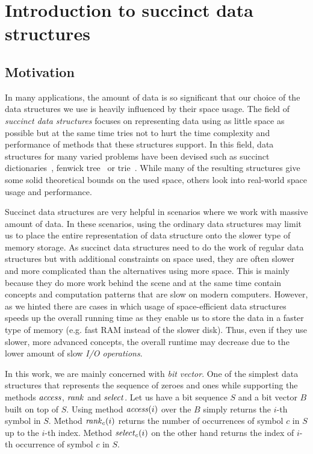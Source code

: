 \chapter{Introduction to succinct data structures}
\label{kap:kap1}


\section{Motivation}

In many applications, the amount of data is so significant that our choice of
the data structures we use is heavily influenced by their space usage. The field
of \textit{succinct data structures} focuses on representing data using as little
space as possible but at the same time tries not to hurt the time complexity and
performance of methods that these structures support. In this field, data structures for many
varied problems have been devised such as succinct dictionaries~\citep{raman2007succinct},
fenwick tree~\citep{bille2017succinct} or trie~\citep{grossi2015fast}. While many of
the resulting structures give some solid theoretical bounds on the used space, others look
into real-world space usage and performance.

Succinct data structures are very helpful in scenarios where we work with massive
amount of data. In these scenarios, using the ordinary data structures may limit us to place
the entire representation of data structure onto the slower type of memory storage. As succinct
data structures need to do the work of regular data structures but with additional constraints
on space used, they are often slower and more complicated than the alternatives using more
space. This is mainly because they do more work behind the scene and at the same time contain
concepts and computation patterns that are slow on modern computers. However, as we hinted
there are cases in which usage of space-efficient data structures speeds up the overall
running time as they enable us to store the data in a faster type of memory (e.g. fast RAM
instead of the slower disk). Thus, even if they use slower, more advanced concepts, the overall
runtime may decrease due to the lower amount of slow \textit{I/O operations}.

In this work, we are mainly concerned with \textit{bit vector}. One of the simplest
data structures that represents the sequence of zeroes and ones while supporting the
methods $\mathit{access}$, $\mathit{rank}$ and $\mathit{select}$. Let us have a bit sequence $S$ and a bit
vector $B$ built on top of $S$. Using method $\mathit{access}(i)$ over the $B$ simply returns
the $i$-th symbol in $S$. Method $\mathit{rank}_c(i)$ returns the number of occurrences of
symbol $c$ in $S$ up to the $i$-th index. Method $\mathit{select}_c(i)$ on the other hand
returns the index of $i$-th occurrence of symbol $c$ in $S$.

